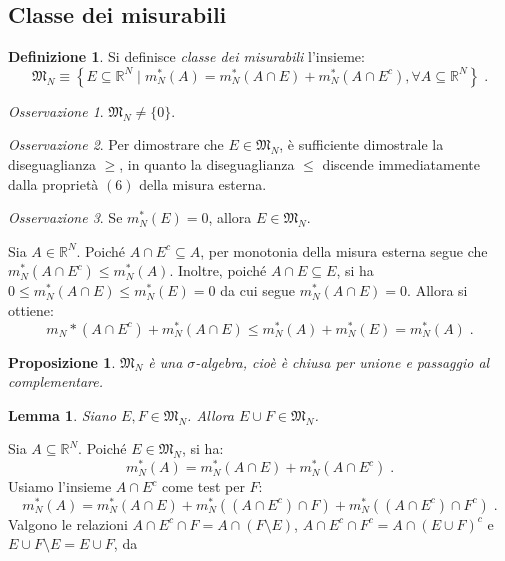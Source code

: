 \documentclass[a4paper,12pt]{report}
\theoremstyle{plain}
\newtheorem{lem}{Lemma}[section]
\newtheorem{prop}{Proposizione}[section]
\theoremstyle{definition}
\newtheorem{defn}{Definizione}[section]
\theoremstyle{remark}
\newtheorem{oss}{Osservazione}[section]
\numberwithin{equation}{section}
\begin{document}
\subsection{Classe dei misurabili}
\begin{defn} Si definisce \emph{classe dei misurabili} l'insieme:
\begin{equation}
\mathfrak{M}_N\equiv\left\{E \subseteq \mathbb{R}^N\;|\; m_N^*(A)=m_N^*(A\cap E)+m_N^*(A\cap E^c), \forall A \subseteq
 \mathbb{R}^N\right\}\;.
\end{equation}
\end{defn}
\begin{oss} $\mathfrak{M}_N \ne \{0\}$.
\end{oss}
\begin{oss} Per dimostrare che $E \in \mathfrak{M}_N$, è sufficiente dimostrale la diseguaglianza $\ge$, in quanto la diseguaglianza $\le$ discende immediatamente dalla proprietà $(6)$ della misura esterna.
\end{oss}
\begin{oss} Se $m_N^*(E)=0$, allora $E \in \mathfrak{M}_N$.
\end{oss}
\proof Sia $A \in \mathbb{R}^N$. Poiché $A \cap E^c \subseteq A$, per monotonia della misura esterna segue che $m_N^*(A\cap E^c)\le m_N^*(A)$. Inoltre, poiché $A\cap E \subseteq E$, si ha $0 \le m_N^*(A \cap E) \le m_N^*(E)=0$ da cui segue $m_N^*(A \cap E)=0$. Allora si ottiene:
\begin{equation}
m_N*(A \cap E^c)+m_N^*(A \cap E) \le m_N^*(A)+m_N^*(E)= m_N^*(A)\;.
\end{equation}
\endproof
\begin{prop} $\mathfrak{M}_N$ è una $\sigma$-algebra, cioè è chiusa per unione e passaggio al complementare.
\end{prop}
\begin{lem} Siano $E,F \in \mathfrak{M}_N$. Allora $E \cup F \in \mathfrak{M}_N$.
\end{lem}
\proof Sia $A \subseteq \mathbb{R}^N$. Poiché $E \in \mathfrak{M}_N$, si ha:
\begin{equation}
m_N^*(A)=m_N^*(A \cap E) + m_N^*(A \cap E^c)\;.
\end{equation}
Usiamo l'insieme $A \cap E^c$ come test per $F$:
\begin{equation}
m_N^*(A)=m_N^*(A \cap E)+m_N^*((A\cap E^c)\cap F)+m_N^*((A\cap E^c)\cap F^c)\;.
\end{equation}
Valgono le relazioni $A\cap E^c \cap F=A \cap (F\setminus E)$, $A\cap E^c \cap F^c=A\cap(E\cup F)^c$ e $E\cup F\setminus E=E\cup F$, da 
\end{document}
